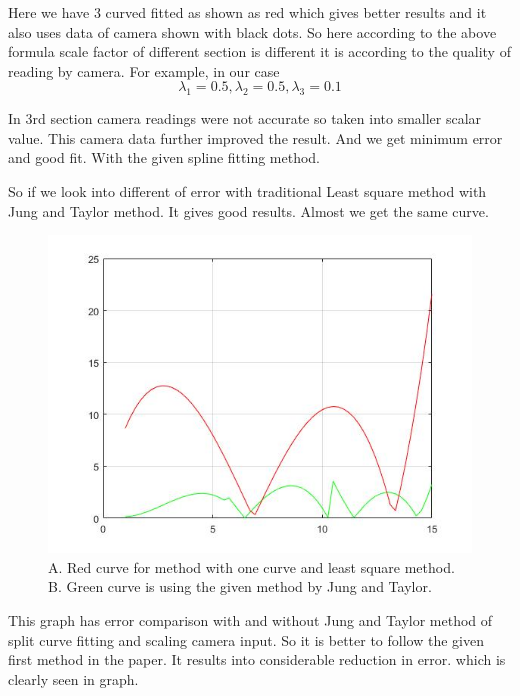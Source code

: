 Here we have 3 curved fitted as shown as red which gives better results and it also uses data of camera shown with black dots. So here according to the above formula scale factor of different section is different it is according to the quality of reading by camera.
For example, in our case 
\begin{equation}
\lambda_1=0.5 ,\lambda_2=0.5 ,\lambda_3=0.1
\end{equation}

In 3rd section camera readings were not accurate so taken into smaller scalar value. This camera data further improved the result. And we get minimum error and good fit. With the given spline fitting method.

So if we look into different of error with traditional Least square method with Jung and Taylor method. It gives good results. Almost we get the same curve.

\begin{figure}
\includegraphics[width=\textwidth]{./figures/ErrorC.jpg}
\caption{A. Red curve for method with one curve and least square method. 
B. Green curve is using the given method by Jung and Taylor.}
\end{figure}

This graph has error comparison with and without Jung and Taylor method of split curve fitting and scaling camera input.
So it is better to follow the given first method in the paper. It results into considerable reduction in error. which is clearly seen in graph.
  